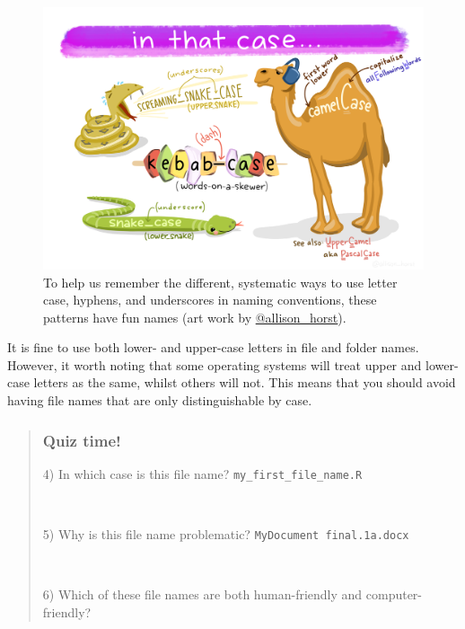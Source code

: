 \documentclass[
  letterpaper,
  DIV=11,
  numbers=noendperiod]{scrreprt}
\begin{document}
\begin{figure}[H]

{\centering \includegraphics{images/AHorst_InThatCase.png}

}

\caption{To help us remember the different, systematic ways to use
letter case, hyphens, and underscores in naming conventions, these
patterns have fun names (art work by
\href{https://allisonhorst.com/allison-horst}{@allison\_horst}).}

\end{figure}%

It is fine to use both lower- and upper-case letters in file and folder
names. However, it worth noting that some operating systems will treat
upper and lower-case letters as the same, whilst others will not. This
means that you should avoid having file names that are only
distinguishable by case.

\begin{quote}
\subsubsection*{Quiz time!}\label{quiz-time-1}

4) In which case is this file name? \texttt{my\_first\_file\_name.R}

~

5) Why is this file name problematic? \texttt{MyDocument\ final.1a.docx}

~

6) Which of these file names are both human-friendly and
computer-friendly?
\end{quote}
\end{document}
